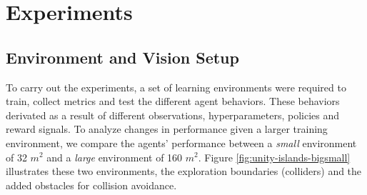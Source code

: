 \section{Experiments} \label{chap:3:experiments}
\subsection{Environment and Vision Setup}\label{chap:4:setup}





To carry out the experiments, a set of learning environments were required to train, collect metrics and test the different agent behaviors. These behaviors derivated as a result of different observations, hyperparameters, policies and reward signals. 
To analyze changes in performance given a larger training environment, we compare the agents' performance between a \textit{small} environment of 32 $m^2$ and a \textit{large} environment of 160 $m^2$.
Figure \ref{fig:unity-islands-bigsmall} illustrates these two environments, the exploration boundaries (colliders) and the added obstacles for collision avoidance.

